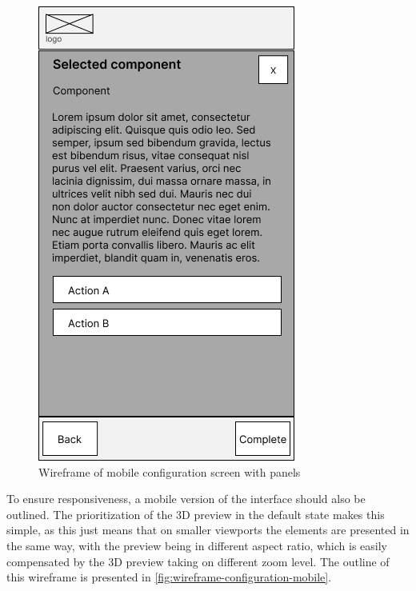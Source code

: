 \begin{figure}[h]
\begin{minipage}{0.4\textwidth}
        \centering
        \includegraphics[width=\linewidth]{images/wireframe_configuration_mobile_panels.png}
        \caption{Wireframe of mobile configuration screen with panels}
        \label{fig:wireframe-configuration-panel-mobile}
    \end{minipage}
\end{figure}

To ensure responsiveness, a mobile version of the interface should also be outlined. The prioritization of the 3D preview in the default state makes this simple, as this just means that on smaller viewports the elements are presented in the same way, with the preview being in different aspect ratio, which is easily compensated by the 3D preview taking on different zoom level. The outline of this wireframe is presented in \autoref{fig:wireframe-configuration-mobile}.

